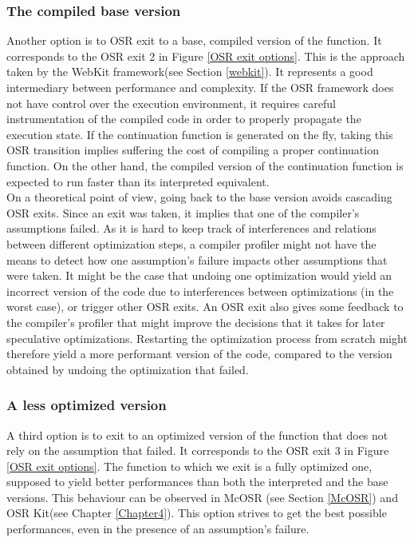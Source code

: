 \subsubsection{The compiled base version}
Another option is to OSR exit to a base, compiled version of the function.
It corresponds to the OSR exit 2 in Figure \ref{OSR exit options}.
This is the approach taken by the WebKit framework\cite{WebKitURL}(see Section \ref{webkit}).
It represents a good intermediary between performance and complexity.
If the OSR framework does not have control over the execution environment, it requires careful instrumentation of the compiled code in order to properly propagate the execution state.
If the continuation function is generated on the fly, taking this OSR transition implies suffering the cost of compiling a proper continuation function.
On the other hand, the compiled version of the continuation function is expected to run faster than its interpreted equivalent.\\

On a theoretical point of view, going back to the base version avoids cascading OSR exits.
Since an exit was taken, it implies that one of the compiler's assumptions failed.
As it is hard to keep track of interferences and relations between different optimization steps, a compiler profiler might not have the means to detect how one assumption's failure impacts other assumptions that were taken.
It might be the case that undoing one optimization would yield an incorrect version of the code due to interferences between optimizations (in the worst case), or trigger other OSR exits.
An OSR exit also gives some feedback to the compiler's profiler that might improve the decisions that it takes for later speculative optimizations.
Restarting the optimization process from scratch might therefore yield a more performant version of the code, compared to the version obtained by undoing the optimization that failed.\\

\subsubsection{A less optimized version}
A third option is to exit to an optimized version of the function that does not rely on the assumption that failed.
It corresponds to the OSR exit 3 in Figure \ref{OSR exit options}.
The function to which we exit is a fully optimized one, supposed to yield better performances than both the interpreted and the base versions.
This behaviour can be observed in McOSR\cite{lameed2013modular} (see Section \ref{McOSR}) and OSR Kit\cite{OSRKit}(see Chapter \ref{Chapter4}).
This option strives to get the best possible performances, even in the presence of an assumption's failure.\\

